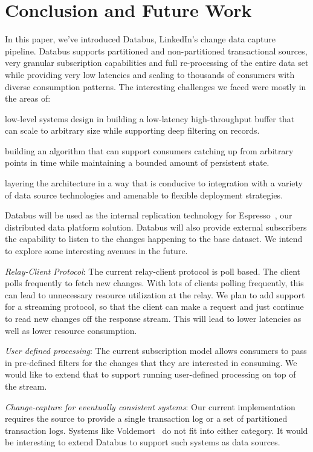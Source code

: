 \section{Conclusion and Future Work}
In this paper, we've introduced Databus, LinkedIn's change data capture pipeline. 
Databus supports partitioned and non-partitioned transactional sources, very granular subscription capabilities and full re-processing of the entire data set while providing very low latencies and scaling to thousands of consumers with diverse consumption patterns. 
The interesting challenges we faced were mostly in the areas of:
\begin{itemize*}
\item low-level systems design in building a low-latency high-throughput buffer that can scale to arbitrary size while supporting deep filtering on records.
\item building an algorithm that can support consumers catching up from arbitrary points in time while maintaining a bounded amount of persistent state.
\item layering the architecture in a way that is conducive to integration with a variety of data source technologies and amenable to flexible deployment strategies.
\end{itemize*}

Databus will be used as the internal replication technology for Espresso~\cite{linkedin12}, our distributed data platform solution. Databus will also provide external subscribers the capability to listen to the changes happening to the base dataset. We intend to explore some interesting avenues in the future. 
\begin{itemize*}
\item \emph{Relay-Client Protocol}: The current relay-client protocol is poll based. The client polls frequently to fetch new changes. With lots of clients polling frequently, this can lead to unnecessary resource utilization at the relay. We plan to add support for a streaming protocol, so that the client can make a request and just continue to read new changes off the response stream. This will lead to lower latencies as well as lower resource consumption. 
\item \emph{User defined processing}: The current subscription model allows consumers to pass in pre-defined filters for the changes that they are interested in consuming. We would like to extend that to support running user-defined processing on top of the stream. 
\item \emph{Change-capture for eventually consistent systems}: Our current implementation requires the source to provide a single transaction log or a set of partitioned transaction logs. Systems like Voldemort~\cite{linkedin12} do not fit into either category. It would be interesting to extend Databus to support such systems as data sources. 
\end{itemize*}
